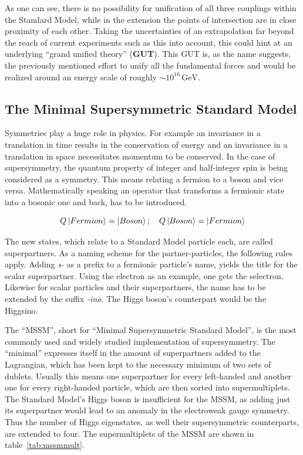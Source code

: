 As one can see, there is no possibility for unification of all three couplings within the Standard Model, while in the extension the points of intersection are in close proximity of each other. Taking the uncertainties of an extrapolation far beyond the reach of current experiments such as this into account, this could hint at an underlying ``grand unified theory'' (\textbf{GUT}). This GUT is, as the name suggests, the previously mentioned effort to unify all the fundamental forces and would be realized around an energy scale of roughly $\sim 10^{16}\,\text{GeV}$.



\subsection{The Minimal Supersymmetric Standard Model}

Symmetries play a huge role in physics. For example an invariance in a translation in time results in the conservation of energy and an invariance in a translation in space necessitates momentum to be conserved. In the case of supersymmetry, the quantum property of integer and half-integer spin is being considered as a symmetry. This means relating a fermion to a boson and vice versa. Mathematically speaking an operator that transforms a fermionic state into a bosonic one and back, has to be introduced.

\begin{equation}
  \label{eq:fermiboso}
  Q \Ket{Fermion} = \Ket{Boson}; \quad Q \Ket{Boson} = \Ket{Fermion}
\end{equation}

The new states, which relate to a Standard Model particle each, are called superpartners. As a naming scheme for the partner-particles, the following rules apply. Adding \textit{s-} as a prefix to a fermionic particle's name, yields the title for the scalar superpartner. Using the electron as an example, one gets the selectron. Likewise for scalar particles and their superpartners, the name has to be extended by the suffix \textit{-ino}. The Higgs boson's counterpart would be the Higgsino.

The ``MSSM'', short for ``Minimal Supersymmetric Standard Model'', is the most commonly used and widely studied implementation of supersymmetry. The ``minimal'' expresses itself in the amount of superpartners added to the Lagrangian, which has been kept to the necessary minimum of two sets of dublets. Usually this means one superpartner for every left-handed and another one for every right-handed particle, which are then sorted into supermultiplets. The Standard Model's Higgs boson is insufficient for the MSSM, as adding just its superpartner would lead to an anomaly in the electroweak gauge symmetry. Thus the number of Higgs eigenstates, as well their supersymmetric counterparts, are extended to four. The supermultiplets of the MSSM are shown in table~\ref{tab:mssmmult}.

